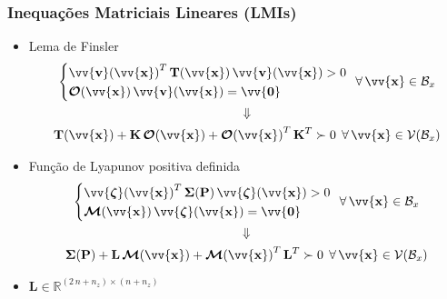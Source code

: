 \documentclass{beamer}
\newcommand*{\Prod}{\,}
\newcommand*{\Bold}[1]{\boldsymbol{\mathbf{#1}}}
\newcommand*{\Matr}[1]{\Bold{#1}}
\newcommand*{\Vect}[1]{\vv{\Bold{#1}}}
\newcommand*{\Transp}[1]{{#1}^{T}}
\newcommand*{\ForAll}{\:\:\forall\,}
\newcommand*{\Vimplies}{\\\Downarrow\\}
\renewcommand{\Prod}{\,}
\begin{document}
\begin{frame}\frametitle{Inequações Matriciais Lineares (LMIs)}
  \begin{itemize}
    \item Lema de Finsler
    \begin{gather}
      \left\{\begin{aligned}
        &\Transp{\Vect{v}(\Vect{x})} \Prod \Matr{T}(\Vect{x}) \Prod \Vect{v}(\Vect{x}) > 0
        \\
        &\Matr{\mathcal{O}}(\Vect{x}) \Prod \Vect{v}(\Vect{x}) = \Vect{0}
      \end{aligned}\right.
      \ForAll \Vect{x} \in \mathcal{B}_x
      \Vimplies
      \Matr{T}(\Vect{x}) + \Matr{K} \Prod \Matr{\mathcal{O}}(\Vect{x}) + \Transp{\Matr{\mathcal{O}}(\Vect{x})} \Prod \Transp{\Matr{K}} \succ 0
      \ForAll \Vect{x} \in \mathcal{V}(\mathcal{B}_x)
    \end{gather}
    \item Função de Lyapunov positiva definida
    \begin{gather}
      \left\{\begin{aligned}
        &\Transp{\Vect{\zeta}(\Vect{x})} \Prod \Matr{\Sigma}(\Matr{P}) \Prod \Vect{\zeta}(\Vect{x}) > 0
        \\
        &\Matr{\mathcal{M}}(\Vect{x}) \Prod \Vect{\zeta}(\Vect{x}) = \Vect{0}
      \end{aligned}\right.
      \ForAll \Vect{x} \in \mathcal{B}_x
      \Vimplies
      \Matr{\Sigma}(\Matr{P}) + \Matr{L} \Prod \Matr{\mathcal{M}}(\Vect{x}) + \Transp{\Matr{\mathcal{M}}(\Vect{x})} \Prod \Transp{\Matr{L}} \succ 0
      \ForAll \Vect{x} \in \mathcal{V}(\mathcal{B}_x)
    \end{gather}
    \item $\Matr{L} \in \mathbb{R}^{(2 \Prod n + n_z) \times (n + n_z)}$
  \end{itemize}
\end{frame}
\end{document}

